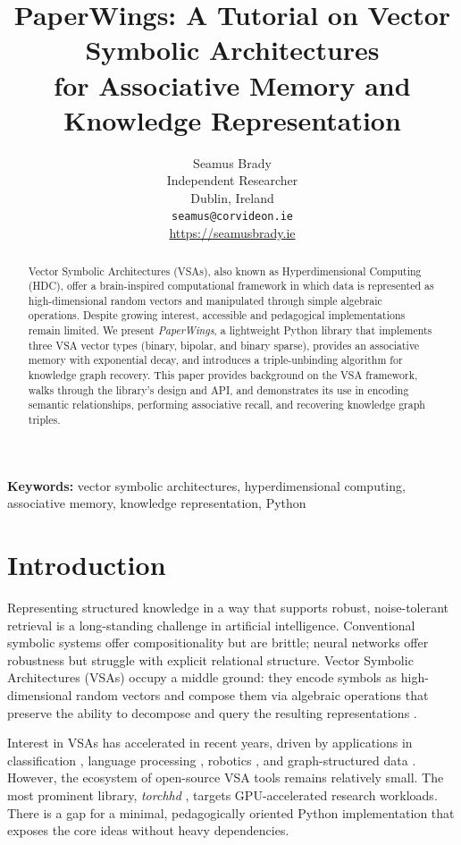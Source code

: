 \documentclass[11pt]{article}
\title{\textbf{PaperWings: A Tutorial on Vector Symbolic Architectures\\for Associative Memory and Knowledge Representation}}
\author{
  Seamus Brady\\
  Independent Researcher\\
  Dublin, Ireland\\
  \texttt{seamus@corvideon.ie}\\
  \url{https://seamusbrady.ie}
}
\date{}
\begin{document}
\maketitle

\begin{abstract}
Vector Symbolic Architectures (VSAs), also known as Hyperdimensional Computing (HDC), offer a brain-inspired computational framework in which data is represented as high-dimensional random vectors and manipulated through simple algebraic operations. Despite growing interest, accessible and pedagogical implementations remain limited. We present \textit{PaperWings}, a lightweight Python library that implements three VSA vector types (binary, bipolar, and binary sparse), provides an associative memory with exponential decay, and introduces a triple-unbinding algorithm for knowledge graph recovery. This paper provides background on the VSA framework, walks through the library's design and API, and demonstrates its use in encoding semantic relationships, performing associative recall, and recovering knowledge graph triples.
\end{abstract}

\noindent\textbf{Keywords:} vector symbolic architectures, hyperdimensional computing, associative memory, knowledge representation, Python

\section{Introduction}

Representing structured knowledge in a way that supports robust, noise-tolerant retrieval is a long-standing challenge in artificial intelligence. Conventional symbolic systems offer compositionality but are brittle; neural networks offer robustness but struggle with explicit relational structure. Vector Symbolic Architectures (VSAs) occupy a middle ground: they encode symbols as high-dimensional random vectors and compose them via algebraic operations that preserve the ability to decompose and query the resulting representations \citep{gayler2003,kanerva2009}.

Interest in VSAs has accelerated in recent years, driven by applications in classification \citep{rahimi2016,karunaratne2020}, language processing \citep{najafabadi2016}, robotics \citep{neubert2019}, and graph-structured data \citep{poduval2022,nunes2022}. However, the ecosystem of open-source VSA tools remains relatively small. The most prominent library, \textit{torchhd} \citep{heddes2023}, targets GPU-accelerated research workloads. There is a gap for a minimal, pedagogically oriented Python implementation that exposes the core ideas without heavy dependencies.
\end{document}
